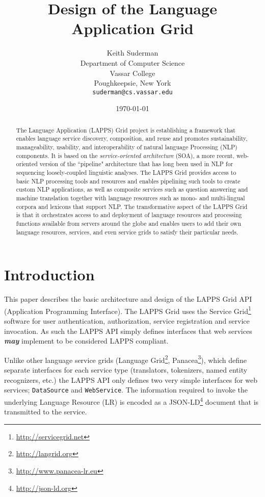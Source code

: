 \documentclass{article}
\newcommand{\lapps}{LAPPS\xspace}
\newcommand{\source}{\texttt{DataSource}\xspace}
\newcommand{\service}{\texttt{WebService}\xspace}
\newcommand{\definedterm}[1]{\textbf{\textit{#1}}\xspace}
\newcommand{\may}{\definedterm{may}}
\begin{document}
\title{Design of the Language Application Grid}
\author{Keith Suderman\\
Department of Computer Science\\
Vassar College\\
Poughkeepsie, New York\\
\texttt{suderman@cs.vassar.edu}}
\date{\today}
\maketitle

\begin{abstract}
The Language Application (LAPPS) Grid project
is establishing a
framework that enables language service discovery, composition, and reuse and promotes sustainability, manageability, usability, and interoperability of natural language Processing (NLP) components. It is based on the {\it service-oriented architecture} (SOA), a more recent, web-oriented version of the  ``pipeline" architecture that has long been used in NLP for sequencing loosely-coupled linguistic analyses. 
The LAPPS Grid provides access to basic NLP processing tools and resources and enables pipelining such tools to create custom NLP applications, as well as
composite services such as question answering and machine translation together with language resources such as mono- and multi-lingual corpora and lexicons that support NLP. 
The transformative aspect of the LAPPS Grid is that it orchestrates  access to and deployment of language resources and processing functions available from servers around the globe and enables users to add their own language resources, services, and even service grids to satisfy their particular needs.
\end{abstract}


\section{Introduction}

This paper describes the basic architecture and design of the \lapps Grid API (Application Programming Interface). The \lapps Grid uses the Service Grid\footnote{\url{http://servicegrid.net}} software for user authentication, authorization, service registration and service invocation. As such the \lapps API simply defines interfaces that web services \may implement to be considered \lapps compliant.

Unlike other language service grids (Language Grid\footnote{\url{http://langrid.org}}, Panacea\footnote{\url{http://www.panacea-lr.eu}}), which define separate interfaces for each service type (translators, tokenizers, named entity recognizers, etc.) the \lapps API only defines two very simple interfaces for web services; \source and \service. The information required to invoke the underlying Language Resource (LR) is encoded as a JSON-LD\footnote{\url{http://json-ld.org}} document that is transmitted to the service.
\end{document}
